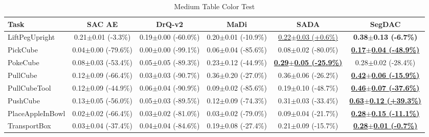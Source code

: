 \begin{table}[htbp]
\centering
\scriptsize
\caption{Medium Table Color Test}
\label{tab:appendix_tablecolortest_medium}
\begin{adjustbox}{max width=\textwidth}
\begin{tabular}{l*{5}{c}}
\toprule
\textbf{Task} & \textbf{SAC AE} & \textbf{DrQ-v2} & \textbf{MaDi} & \textbf{SADA} & \textbf{SegDAC} \\
\midrule
LiftPegUpright & 0.21$\pm$0.01 \scriptsize{(-3.3\%)} & 0.19$\pm$0.00 \scriptsize{(-60.0\%)} & 0.20$\pm$0.01 \scriptsize{(-10.9\%)} & \underline{0.22$\pm$0.03 \scriptsize{(+0.6\%)}} & \textbf{0.38$\pm$0.13 \scriptsize{(-6.7\%)}} \\
PickCube & 0.04$\pm$0.00 \scriptsize{(-79.6\%)} & 0.00$\pm$0.00 \scriptsize{(-99.1\%)} & 0.06$\pm$0.04 \scriptsize{(-85.6\%)} & 0.08$\pm$0.02 \scriptsize{(-80.0\%)} & \textbf{\underline{0.17$\pm$0.04 \scriptsize{(-48.9\%)}}} \\
PokeCube & 0.08$\pm$0.03 \scriptsize{(-53.4\%)} & 0.05$\pm$0.05 \scriptsize{(-89.3\%)} & 0.23$\pm$0.12 \scriptsize{(-44.9\%)} & \textbf{\underline{0.29$\pm$0.05 \scriptsize{(-25.9\%)}}} & 0.28$\pm$0.02 \scriptsize{(-28.4\%)} \\
PullCube & 0.12$\pm$0.09 \scriptsize{(-66.4\%)} & 0.03$\pm$0.03 \scriptsize{(-90.7\%)} & 0.36$\pm$0.20 \scriptsize{(-27.0\%)} & 0.36$\pm$0.06 \scriptsize{(-26.2\%)} & \textbf{\underline{0.42$\pm$0.06 \scriptsize{(-15.9\%)}}} \\
PullCubeTool & 0.12$\pm$0.09 \scriptsize{(-44.9\%)} & 0.06$\pm$0.04 \scriptsize{(-90.9\%)} & 0.09$\pm$0.02 \scriptsize{(-85.6\%)} & 0.19$\pm$0.10 \scriptsize{(-48.7\%)} & \textbf{\underline{0.46$\pm$0.07 \scriptsize{(-37.6\%)}}} \\
PushCube & 0.13$\pm$0.05 \scriptsize{(-56.0\%)} & 0.05$\pm$0.03 \scriptsize{(-89.5\%)} & 0.12$\pm$0.09 \scriptsize{(-74.3\%)} & 0.31$\pm$0.03 \scriptsize{(-33.4\%)} & \textbf{\underline{0.63$\pm$0.12 \scriptsize{(+39.3\%)}}} \\
PlaceAppleInBowl & 0.02$\pm$0.02 \scriptsize{(-66.4\%)} & 0.03$\pm$0.02 \scriptsize{(-81.0\%)} & 0.03$\pm$0.02 \scriptsize{(-79.0\%)} & 0.09$\pm$0.04 \scriptsize{(-21.7\%)} & \textbf{\underline{0.28$\pm$0.15 \scriptsize{(-11.1\%)}}} \\
TransportBox & 0.03$\pm$0.04 \scriptsize{(-37.4\%)} & 0.04$\pm$0.04 \scriptsize{(-84.6\%)} & 0.19$\pm$0.08 \scriptsize{(-27.4\%)} & 0.21$\pm$0.09 \scriptsize{(-15.7\%)} & \textbf{\underline{0.28$\pm$0.01 \scriptsize{(-0.7\%)}}} \\
\bottomrule
\end{tabular}
\end{adjustbox}
\end{table}


